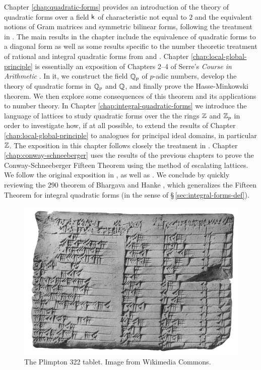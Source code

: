 Chapter \ref{chap:quadratic-forms} provides an introduction of the theory of quadratic forms over a field \(\mathsf{k}\) of characteristic not equal to \(2\) and the equivalent notions of Gram matrices and symmetric bilinear forms, following the treatment in \cite{lam1973quadratic}. The main results in the chapter include the equivalence of quadratic forms to a diagonal form as well as some results specific to the number theoretic treatment of rational and integral quadratic forms from \cite{cassels2008rational} and \cite{jones1950arithmetic}. Chapter \ref{chap:local-global-principle} is essentially an exposition of Chapters 2--4 of Serre's \emph{Course in Arithmetic} \cite{serre2012course}. In it, we construct the field \(\mathbb{Q}_p\) of \(p\)-adic numbers, develop the theory of quadratic forms in \(\mathbb{Q}_p\) and \(\mathbb{Q}\), and finally prove the Hasse-Minkowski theorem. We then explore some consequences of this theorem and its applications to number theory. In Chapter \ref{chap:integral-quadratic-forms} we introduce the language of lattices to study quadratic forms over the the rings \(\mathbb{Z}\) and \(\mathbb{Z}_p\) in order to investigate how, if at all possible, to extend the results of Chapter \ref{chap:local-global-principle} to analogues for principal ideal domains, in particular \(\mathbb{Z}\). The exposition in this chapter follows closely the treatment in \cite{cassels2008rational,gerstein2008basic,jones1950arithmetic}. Chapter \ref{chap:conway-schneeberger} uses the results of the previous chapters to prove the Conway-Schneeberger Fifteen Theorem using the method of escalating lattices. We follow the original exposition in \cite{bhargava2000conway}, as well as \cite{moon2008universal}. We conclude by quickly reviewing the \(290\) theorem of Bhargava and Hanke \cite{bhargava2005universal}, which generalizes the Fifteen Theorem for integral quadratic forms (in the sense of \S\,\ref{sec:integral-forms-def}).


\begin{figure}
    \centering
    \includegraphics[width=\textwidth]{assets/Plimpton_322.jpg}
    \caption[The Plimpton 322 tablet.]{The Plimpton 322 tablet. Image from Wikimedia Commons.}
    \label{fig:plimpton-322}
\end{figure}

